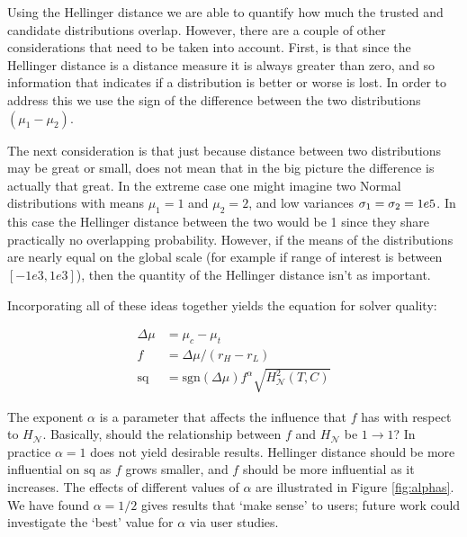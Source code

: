 Using the Hellinger distance we are able to quantify how much the trusted and candidate distributions overlap. However, there are a couple of other considerations that need to be taken into account. First, is that since the Hellinger distance is a distance measure it is always greater than zero, and so information that indicates if a distribution is better or worse is lost. In order to address this we use the sign of the difference between the two distributions $(\mu_1-\mu_2)$.

The next consideration is that just because distance between two distributions may be great or small, does not mean that in the big picture the difference is actually that great. In the extreme case one might imagine two Normal distributions with means $\mu_1=1$ and $\mu_2=2$, and low variances $\sigma_1=\sigma_2=1e\-5$. In this case the Hellinger distance between the two would be 1 since they share practically no overlapping probability. However, if the means of the distributions are nearly equal on the global scale (for example if range of interest is between $[-1e3,1e3]$), then the quantity of the Hellinger distance isn't as important.

Incorporating all of these ideas together yields the equation for solver quality:

\begin{align}
    \Delta \mu &= \mu_c-\mu_t\\
    f &= \Delta \mu/(r_H-r_L) \label{eq:f}\\
    \text{sq} &= \text{sgn}(\Delta \mu)f^{\alpha}\sqrt{H_{\mathcal{N}}^{2}(T,C)} \label{eq:sq}
\end{align}

The exponent $\alpha$ is a parameter that affects the influence that $f$ has with respect to $H_{\mathcal{N}}$. Basically, should the relationship between $f$ and $H_{\mathcal{N}}$ be $1\to1$? In practice $\alpha=1$ does not yield desirable results. Hellinger distance should be more influential on $\text{sq}$ as $f$ grows smaller, and $f$ should be more influential as it increases. The effects of different values of $\alpha$ are illustrated in Figure \ref{fig:alphas}. We have found $\alpha=1/2$ gives results that `make sense' to users; future work could investigate the `best' value for $\alpha$ via user studies.

